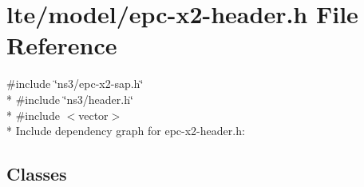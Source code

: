 \hypertarget{epc-x2-header_8h}{}\section{lte/model/epc-\/x2-\/header.h File Reference}
\label{epc-x2-header_8h}
{\ttfamily \#include \char`\"{}ns3/epc-\/x2-\/sap.\+h\char`\"{}}\\*
{\ttfamily \#include \char`\"{}ns3/header.\+h\char`\"{}}\\*
{\ttfamily \#include $<$vector$>$}\\*
Include dependency graph for epc-\/x2-\/header.h\+:
\subsection*{Classes}
